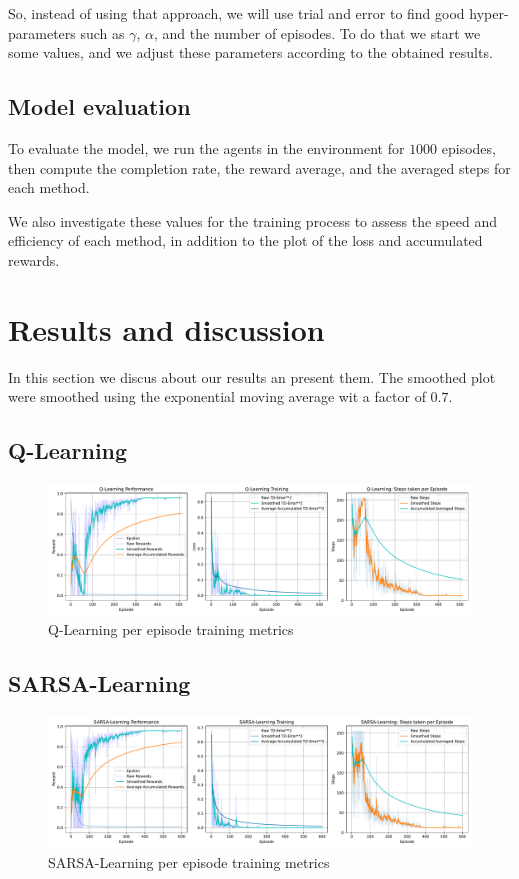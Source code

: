 So, instead of using that approach, we will use trial and error to find good hyper-parameters such as $\gamma$, $\alpha$, and the number of episodes. To do that we start we some values, and we adjust these parameters according to the obtained results.

\subsection{Model evaluation}
To evaluate the model, we run the agents in the environment for $1000$ episodes, then compute the completion rate, the reward average, and the averaged steps for each method.

We also investigate these values for the training process to assess the speed and efficiency of each method, in addition to the plot of the loss and accumulated rewards.
\section{Results and discussion}
In this section we discus about our results an present them. The smoothed plot were smoothed using the exponential moving average wit a factor of $0.7$.
\subsection{Q-Learning}
\begin{figure}[H]
	\centering
	\includegraphics[width=\linewidth]{figures/QLearning_episode.pdf}
	\caption{Q-Learning per episode training metrics}
\end{figure}
\subsection{SARSA-Learning}
\begin{figure}[H]
	\centering
	\includegraphics[width=\linewidth]{figures/SARSALearning_episode.pdf}
	\caption{SARSA-Learning per episode training metrics}
\end{figure}
